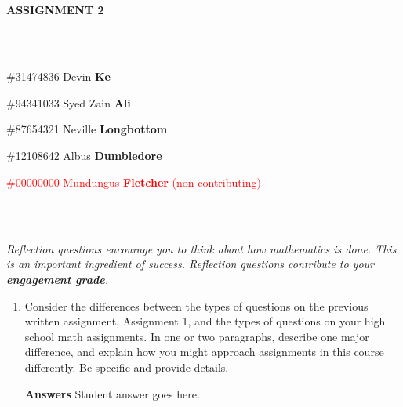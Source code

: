 \documentclass{article}
\begin{document}
\large{\textbf{ASSIGNMENT 2}}

\normalsize

\

\begin{tabular*}{6.5in}{c}
\hline
\end{tabular*}



\begin{itemize}
    \item \#31474836 Devin {\bf Ke} 
    \item \#94341033 Syed Zain {\bf Ali}
    \item \#87654321 Neville {\bf Longbottom}
    \item \#12108642 Albus {\bf Dumbledore}
    \textcolor{red}{\item \#00000000 Mundungus {\bf Fletcher}  (non-contributing)}
\end{itemize}

\begin{tabular*}{6.5in}{c}
\hline
\end{tabular*}

\ 

\textit{Reflection questions encourage you to think about how mathematics is done. This is an important ingredient of success. Reflection questions contribute to your \textbf{engagement grade}.}

\begin{enumerate}[leftmargin=*] 

\item Consider the differences between the types of questions on the previous written assignment, Assignment 1, and the types of questions on your high school math assignments. In one or two paragraphs, describe one major difference, and explain how you might approach assignments in this course differently. Be specific and provide details.

\color{blue}
\textbf{Answers} \newline 
Student answer goes here.
\color{black}


\end{enumerate}

\begin{tabular*}{6.5in}{c}
\hline
\end{tabular*}
\end{document}
